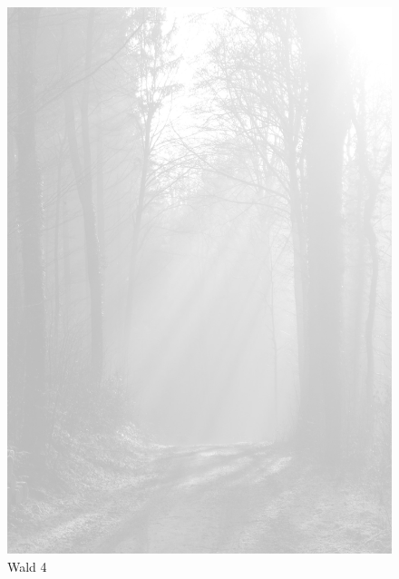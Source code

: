 \documentclass[ngerman,a4paper,11pt]{scrreprt}
\begin{document}
\begin{figure}[H]
\centering
\includegraphics[width=\textwidth,height=.8\textheight]{Bilder/Bilder/750_0010_23639_1256619_Wald.png}
\caption{Wald 4}
\end{figure}
\end{document}
